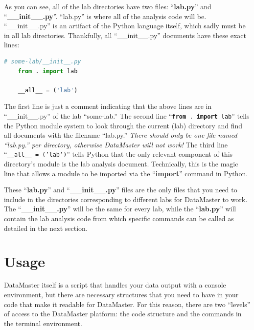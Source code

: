 \documentclass[12pt]{article}
\begin{document}
{As you can see, all of the lab directories have two files: ``\textbf{lab.py}'' and ``\textbf{\_\_init\_\_.py}''. ``lab.py'' is where all of the analysis code will be. ``\_\_init\_\_.py'' is an artifact of the Python language itself, which sadly must be in all lab directories. Thankfully, all ``\_\_init\_\_.py'' documents have these exact lines:
\begin{framed}
  \begin{lstlisting}[language=Python]
    # some-lab/__init__.py
    from . import lab

    __all__ = ('lab')
  \end{lstlisting}
\end{framed}
The first line is just a comment indicating that the above lines are in ``\_\_init\_\_.py'' of the lab ``some-lab.'' The second line ``\texttt{\textbf{from} . \textbf{import} lab}'' tells the Python module system to look through the current (lab) directory and find all documents with the filename ``lab.py.'' \textit{There should only be one file named ``lab.py.'' per directory, otherwise DataMaster will not work!} The third line ``\texttt{\_\_all\_\_ = ('lab')}'' tells Python that the only relevant component of this directory's module is the lab analysis document. Technically, this is the magic line that allows a module to be imported via the ``\textbf{import}'' command in Python.

These ``\textbf{lab.py}'' and ``\textbf{\_\_init\_\_.py}'' files are the only files that you need to include in the directories corresponding to different labs for DataMaster to work. The ``\textbf{\_\_init\_\_.py}'' will be the same for every lab, while the ``\textbf{lab.py}'' will contain the lab analysis code from which specific commands can be called as detailed in the next section.

\section*{Usage}
\label{sec:usage}

DataMaster itself is a script that handles your data output with a console environment, but there are necessary structures that you need to have in your code that make it readable for DataMaster. For this reason, there are two ``levels'' of access to the DataMaster platform: the code structure and the commands in the terminal environment.

}
\end{document}
